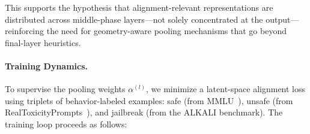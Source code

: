 This supports the hypothesis that alignment-relevant representations are distributed across middle-phase layers—not solely concentrated at the output—reinforcing the need for geometry-aware pooling mechanisms that go beyond final-layer heuristics.


\vspace{1mm}
\paragraph{Training Dynamics.}  
To supervise the pooling weights \(\alpha^{(l)}\), we minimize a latent-space alignment loss using triplets of behavior-labeled examples: safe (from MMLU~\cite{hendrycks2021measuring}), unsafe (from RealToxicityPrompts~\cite{gehman2020realtoxicityprompts}), and jailbreak (from the ALKALI benchmark). The training loop proceeds as follows:

